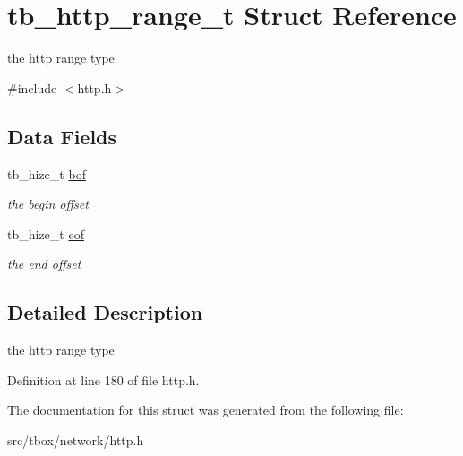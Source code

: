 \hypertarget{structtb__http__range__t}{\section{tb\-\_\-http\-\_\-range\-\_\-t Struct Reference}
\label{structtb__http__range__t}
}


the http range type  




{\ttfamily \#include $<$http.\-h$>$}

\subsection*{Data Fields}
\begin{DoxyCompactItemize}
\item 
\hypertarget{structtb__http__range__t_a41b96d07c74b4fa4bf164fa3b4b4e3e0}{tb\-\_\-hize\-\_\-t \hyperlink{structtb__http__range__t_a41b96d07c74b4fa4bf164fa3b4b4e3e0}{bof}}\label{structtb__http__range__t_a41b96d07c74b4fa4bf164fa3b4b4e3e0}

\begin{DoxyCompactList}\small\item\em the begin offset \end{DoxyCompactList}\item 
\hypertarget{structtb__http__range__t_a3a07110fc8c202011765adf46ae491c1}{tb\-\_\-hize\-\_\-t \hyperlink{structtb__http__range__t_a3a07110fc8c202011765adf46ae491c1}{eof}}\label{structtb__http__range__t_a3a07110fc8c202011765adf46ae491c1}

\begin{DoxyCompactList}\small\item\em the end offset \end{DoxyCompactList}\end{DoxyCompactItemize}


\subsection{Detailed Description}
the http range type 

Definition at line 180 of file http.\-h.



The documentation for this struct was generated from the following file\-:\begin{DoxyCompactItemize}
\item 
src/tbox/network/http.\-h\end{DoxyCompactItemize}
